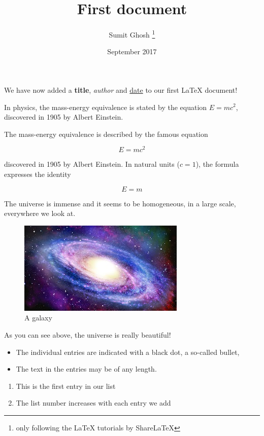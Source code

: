 \documentclass[12pt, letterpaper]{article}
\title{First document}
\author{Sumit Ghosh \thanks{only following the LaTeX tutorials by ShareLaTeX}}
\date{September 2017}
\begin{document}
\maketitle

We have now added a \textbf{title}, \textit{author} and \underline{date} to our first \LaTeX{} document!

In physics, the mass-energy equivalence is stated by the equation $E=mc^2$, discovered in 1905 by Albert Einstein.

The mass-energy equivalence is described by the famous equation

$$E=mc^2$$

discovered in 1905 by Albert Einstein.
In natural units ($c=1$), the formula expresses the identity

\begin{equation}
E=m
\end{equation}

The universe is immense and it seems to be homogeneous, in a large scale, everywhere we look at.

\begin{figure}[h]
	\centering
	\includegraphics{galaxy}
	\caption{A galaxy}
	\label{fig:mesh1}
\end{figure}

As you can see above, the universe is really beautiful!

\begin{itemize}
		\item The individual entries are indicated with a black dot, a so-called bullet,
		\item The text in the entries may be of any length.
\end{itemize}

\begin{enumerate}
	\item This is the first entry in our list
	\item The list number increases with each entry we add
\end{enumerate}
\end{document}
